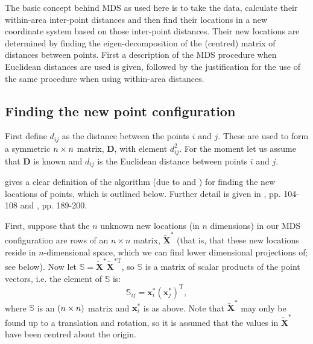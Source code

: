 The basic concept behind MDS as used here is to take the data, calculate their within-area inter-point distances and then find their locations in a new coordinate system based on those inter-point distances. Their new locations are determined by finding the eigen-decomposition of the (centred) matrix of distances between points. First a description of the MDS procedure when Euclidean distances are used is given, followed by the justification for the use of the same procedure when using within-area distances. 

\subsection{Finding the new point configuration}

First define $d_{ij}$ as the distance between the points $i$ and $j$. These are used to form a symmetric $n \times n$ matrix, $\mathbf{D}$, with \ijth element $d^2_{ij}$. For the moment let us assume that $\mathbf{D}$ is known and $d_{ij}$ is the Euclidean distance between points $i$ and $j$. 

 gives a clear definition of the algorithm (due to \cite{schoenberg35} and \cite{torgerson}) for finding the new locations of points, which is outlined below. Further detail is given in , pp. 104-108 and , pp. 189-200.

First, suppose that the $n$ unknown new locations (in $n$ dimensions) in our MDS configuration are rows of an $n \times n$ matrix, $\tilde{\mathbf{X}}^*$ (that is, that these new locations reside in $n$-dimensional space, which we can find lower dimensional projections of; see below). Now let $\mathbb{S}=\tilde{\mathbf{X}}^{*} \tilde{\mathbf{X}}^{*\text{T}} $, so $\mathbb{S}$ is a matrix of scalar products of the point vectors, i.e. the \ijth element of $\mathbb{S}$ is:
\begin{equation}
\mathbb{S}_{ij} = \mathbf{x}_i^* \left ( \mathbf{x}_j^* \right)^\text{T},
\label{selem}
\end{equation}
where $\mathbb{S}$ is an $(n\times n)$ matrix and $\mathbf{x}_i^*$ is as above. Note that $\tilde{\mathbf{X}}^*$ may only be found up to a translation and rotation, so it is assumed that the values in $\tilde{\mathbf{X}}^*$ have been centred about the origin.

